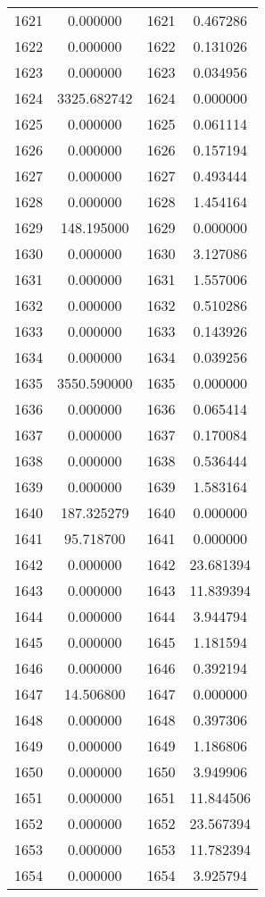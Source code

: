 \documentclass[12pt]{article}
\begin{document}
\begin{longtable}{@{}cccc@{}}
1621 & 0.000000 & 1621 & 0.467286 \\
1622 & 0.000000 & 1622 & 0.131026 \\
1623 & 0.000000 & 1623 & 0.034956 \\
1624 & 3325.682742 & 1624 & 0.000000 \\
1625 & 0.000000 & 1625 & 0.061114 \\
1626 & 0.000000 & 1626 & 0.157194 \\
1627 & 0.000000 & 1627 & 0.493444 \\
1628 & 0.000000 & 1628 & 1.454164 \\
1629 & 148.195000 & 1629 & 0.000000 \\
1630 & 0.000000 & 1630 & 3.127086 \\
1631 & 0.000000 & 1631 & 1.557006 \\
1632 & 0.000000 & 1632 & 0.510286 \\
1633 & 0.000000 & 1633 & 0.143926 \\
1634 & 0.000000 & 1634 & 0.039256 \\
1635 & 3550.590000 & 1635 & 0.000000 \\
1636 & 0.000000 & 1636 & 0.065414 \\
1637 & 0.000000 & 1637 & 0.170084 \\
1638 & 0.000000 & 1638 & 0.536444 \\
1639 & 0.000000 & 1639 & 1.583164 \\
1640 & 187.325279 & 1640 & 0.000000 \\
1641 & 95.718700 & 1641 & 0.000000 \\
1642 & 0.000000 & 1642 & 23.681394 \\
1643 & 0.000000 & 1643 & 11.839394 \\
1644 & 0.000000 & 1644 & 3.944794 \\
1645 & 0.000000 & 1645 & 1.181594 \\
1646 & 0.000000 & 1646 & 0.392194 \\
1647 & 14.506800 & 1647 & 0.000000 \\
1648 & 0.000000 & 1648 & 0.397306 \\
1649 & 0.000000 & 1649 & 1.186806 \\
1650 & 0.000000 & 1650 & 3.949906 \\
1651 & 0.000000 & 1651 & 11.844506 \\
1652 & 0.000000 & 1652 & 23.567394 \\
1653 & 0.000000 & 1653 & 11.782394 \\
1654 & 0.000000 & 1654 & 3.925794 \\

\end{longtable}
\end{document}
